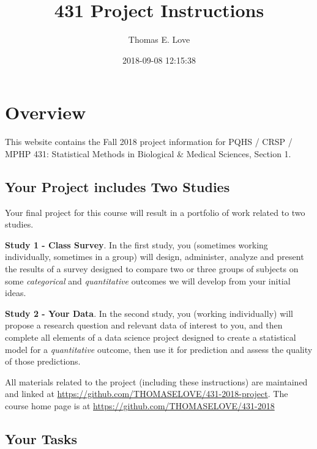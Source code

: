 \documentclass[]{book}
\title{431 Project Instructions}
\author{Thomas E. Love}
\date{2018-09-08 12:15:38}
\theoremstyle{definition}
\theoremstyle{definition}
\theoremstyle{definition}
\theoremstyle{remark}
\begin{document}
\maketitle

{
\setcounter{tocdepth}{1}
\tableofcontents
}
\hypertarget{overview}{%
\chapter*{Overview}\label{overview}}

This website contains the Fall 2018 project information for PQHS / CRSP
/ MPHP 431: Statistical Methods in Biological \& Medical Sciences,
Section 1.

\hypertarget{your-project-includes-two-studies}{%
\section*{Your Project includes Two
Studies}\label{your-project-includes-two-studies}}

Your final project for this course will result in a portfolio of work
related to two studies.

\textbf{Study 1 - Class Survey}. In the first study, you (sometimes
working individually, sometimes in a group) will design, administer,
analyze and present the results of a survey designed to compare two or
three groups of subjects on some \emph{categorical} and
\emph{quantitative} outcomes we will develop from your initial ideas.

\textbf{Study 2 - Your Data}. In the second study, you (working
individually) will propose a research question and relevant data of
interest to you, and then complete all elements of a data science
project designed to create a statistical model for a \emph{quantitative}
outcome, then use it for prediction and assess the quality of those
predictions.

All materials related to the project (including these instructions) are
maintained and linked at
\url{https://github.com/THOMASELOVE/431-2018-project}. The course home
page is at \url{https://github.com/THOMASELOVE/431-2018}

\hypertarget{your-tasks}{%
\section*{Your Tasks}\label{your-tasks}}
\end{document}
